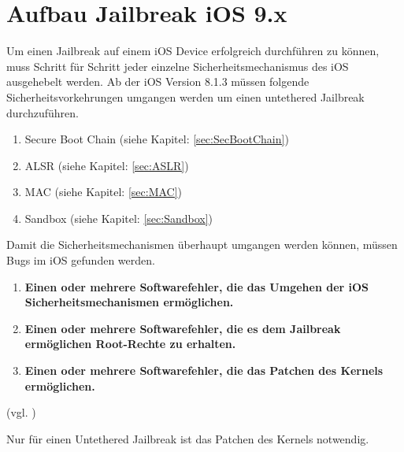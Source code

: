 \section{Aufbau Jailbreak iOS 9.x}
\label{sec:JBAufbau}
Um einen Jailbreak auf einem iOS Device erfolgreich durchführen zu können, muss Schritt für Schritt jeder einzelne Sicherheitsmechanismus des iOS ausgehebelt werden. Ab der iOS Version 8.1.3 müssen folgende Sicherheitsvorkehrungen umgangen werden um einen untethered Jailbreak durchzuführen.

\begin{enumerate}
	    \item Secure Boot Chain (siehe Kapitel: \ref{sec:SecBootChain})
	    \item ALSR (siehe Kapitel: \ref{sec:ASLR})
	    \item MAC (siehe Kapitel: \ref{sec:MAC})
	   \item Sandbox (siehe Kapitel: \ref{sec:Sandbox}) 
\end{enumerate}

Damit die Sicherheitsmechanismen überhaupt umgangen werden können, müssen Bugs im iOS gefunden werden. 
\begin{enumerate}
  \item \textbf{Einen oder mehrere Softwarefehler, die das Umgehen der iOS Sicherheitsmechanismen ermöglichen.}
  \item \textbf{Einen oder mehrere Softwarefehler, die es dem Jailbreak ermöglichen Root-Rechte zu erhalten.}
  \item \textbf{Einen oder mehrere Softwarefehler, die das Patchen des Kernels ermöglichen.}
\end{enumerate}
(vgl. \cite{TaiG[1], TaiG[2], TaiG[3]})

Nur für einen Untethered Jailbreak ist das Patchen des Kernels notwendig.




